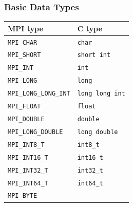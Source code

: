 \documentclass[xcolor={x11names,svgnames,psnames}]{beamer}
\begin{document}
\begin{frame}[fragile=singleslide]
  \frametitle{Basic Data Types}

  \begin{center}
\begin{tabular}{|l|l|}
\hline
  MPI type & C type \\
\hline
\hline
\texttt{MPI_CHAR} & \texttt{char} \\
\hline
\texttt{MPI_SHORT} & \texttt{short int} \\
\hline
\texttt{MPI_INT} & \texttt{int} \\
\hline
\texttt{MPI_LONG} & \texttt{long} \\
\hline
\texttt{MPI_LONG_LONG_INT} & \texttt{long long int} \\
\hline
\texttt{MPI_FLOAT} & \texttt{float} \\
\hline
\texttt{MPI_DOUBLE} & \texttt{double} \\
\hline
\texttt{MPI_LONG_DOUBLE} & \texttt{long double} \\
\hline
\texttt{MPI_INT8_T} & \texttt{int8_t} \\
\hline
\texttt{MPI_INT16_T} & \texttt{int16_t} \\
\hline
\texttt{MPI_INT32_T} & \texttt{int32_t} \\
\hline
\texttt{MPI_INT64_T} & \texttt{int64_t} \\
\hline
\texttt{MPI_BYTE} & \\
\hline
\end{tabular}
\end{center}
\end{frame}

\end{document}

